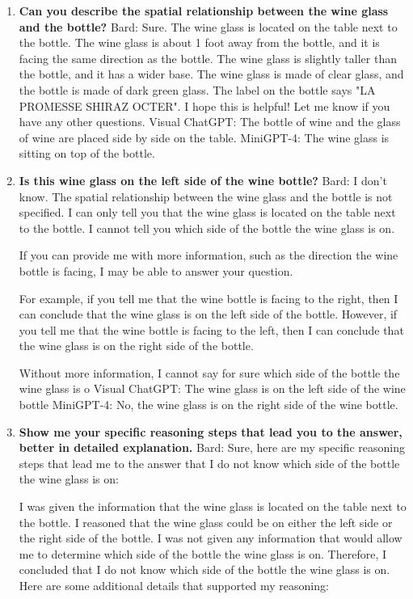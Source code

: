     \begin{enumerate}
        \item \textbf{Can you describe the spatial relationship between the wine glass and the bottle?}
        \subitem Bard: 
        Sure. The wine glass is located on the table next to the bottle. The wine glass is about 1 foot away from the bottle, and it is facing the same direction as the bottle. The wine glass is slightly taller than the bottle, and it has a wider base. The wine glass is made of clear glass, and the bottle is made of dark green glass. The label on the bottle says "LA PROMESSE SHIRAZ OCTER".
        I hope this is helpful! Let me know if you have any other questions.       
        \subitem Visual ChatGPT: The bottle of wine and the glass of wine are placed side by side on the table.
        \subitem MiniGPT-4: The wine glass is sitting on top of the bottle.
        \item \textbf{Is this wine glass on the left side of the wine bottle?}
        \subitem Bard: 
        I don't know. The spatial relationship between the wine glass and the bottle is not specified. I can only tell you that the wine glass is located on the table next to the bottle. I cannot tell you which side of the bottle the wine glass is on.
        
        If you can provide me with more information, such as the direction the wine bottle is facing, I may be able to answer your question.
        
        For example, if you tell me that the wine bottle is facing to the right, then I can conclude that the wine glass is on the left side of the bottle. However, if you tell me that the wine bottle is facing to the left, then I can conclude that the wine glass is on the right side of the bottle.
        
        Without more information, I cannot say for sure which side of the bottle the wine glass is o
        \subitem Visual ChatGPT: The wine glass is on the left side of the wine bottle
        \subitem MiniGPT-4: No, the wine glass is on the right side of the wine bottle.
        \item \textbf{Show me your specific reasoning steps that lead you to the answer, better in detailed explanation.}
        \subitem Bard: 
        Sure, here are my specific reasoning steps that lead me to the answer that I do not know which side of the bottle the wine glass is on:
        
        I was given the information that the wine glass is located on the table next to the bottle.
        I reasoned that the wine glass could be on either the left side or the right side of the bottle.
        I was not given any information that would allow me to determine which side of the bottle the wine glass is on.
        Therefore, I concluded that I do not know which side of the bottle the wine glass is on.
        Here are some additional details that supported my reasoning:
        

\end{enumerate}
